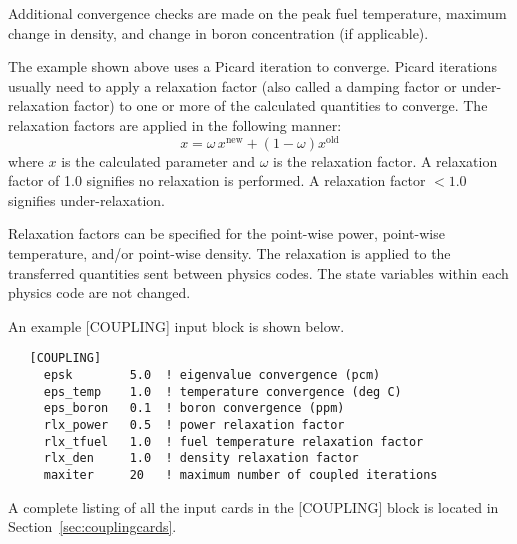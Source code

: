 Additional convergence checks are made on the peak fuel temperature, maximum change in density,
and change in boron concentration (if applicable).

The example shown above uses a Picard iteration to converge.  Picard iterations usually
need to apply a relaxation factor (also called a damping factor or under-relaxation factor) to
one or more of the calculated quantities to converge.
The relaxation factors are applied in the following manner:
\begin{equation}
  x = \omega \, x^{\mbox{new}} + (1 - \omega) x^{\mbox{old}}
\end{equation}
where $x$ is the calculated parameter and $\omega$ is the relaxation factor.
A relaxation factor of 1.0 signifies no relaxation is performed.
A relaxation factor $< 1.0$ signifies under-relaxation.

Relaxation factors can be specified for the point-wise power, point-wise temperature, and/or point-wise density.
The relaxation is applied to the transferred quantities sent between physics codes.  The state variables
within each physics code are not changed.

An example [COUPLING] input block is shown below.

\begin{verbatim}
   [COUPLING]
     epsk        5.0  ! eigenvalue convergence (pcm)
     eps_temp    1.0  ! temperature convergence (deg C)
     eps_boron   0.1  ! boron convergence (ppm)
     rlx_power   0.5  ! power relaxation factor
     rlx_tfuel   1.0  ! fuel temperature relaxation factor
     rlx_den     1.0  ! density relaxation factor
     maxiter     20   ! maximum number of coupled iterations
\end{verbatim}

A complete listing of all the input cards in the [COUPLING] block is located in Section~\ref{sec:couplingcards}.

